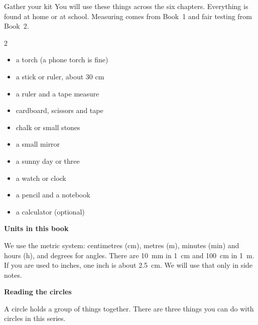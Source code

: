 \begin{tryit}{Gather your kit}
You will use these things across the six chapters. Everything is found at home or at school. Measuring comes from Book~1 and fair testing from Book~2.
\begin{multicols}{2}
\begin{itemize}[leftmargin=1.2em]
\item a torch (a phone torch is fine)
\item a stick or ruler, about 30 cm
\item a ruler and a tape measure
\item cardboard, scissors and tape
\item chalk or small stones
\item a small mirror
\item a sunny day or three
\item a watch or clock
\item a pencil and a notebook
\item a calculator (optional)
\end{itemize}
\end{multicols}
\end{tryit}

{\sans\bfseries\large\color{sky!70!black} Units in this book}\par
We use the metric system: centimetres (cm), metres (m), minutes (min) and hours (h), and degrees for angles.
There are 10~mm in 1~cm and 100~cm in 1~m. If you are used to inches, one inch is about 2.5~cm. We will use that only in side notes.
\clearpage

\thispagestyle{plain}\label{circlecard}
{\sans\bfseries\LARGE\color{ink} Reading the circles}\par\vspace{0.1cm}
A circle holds a group of things together. There are three things you can do with circles in this series.

